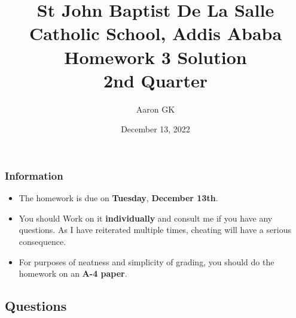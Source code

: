 \documentclass[9pt,addpoints]{exam}
\author{Aaron GK}
\date{December 13, 2022}
\begin{document}
	\title{St John Baptist De La Salle Catholic School, Addis Ababa\\
		\large Homework 3 Solution \\
		2nd Quarter}
	\maketitle
	\begin{center}
		\subsubsection*{Information}
		\begin{itemize}
			\item The homework is due on \textbf{Tuesday}, \textbf{December 13th}.
			\item You should Work on it \textbf{individually} and consult me if you have any questions. As I have reiterated multiple times, cheating will have a serious consequence.
			\item For purposes of neatness and simplicity of grading, you should do the homework on an \textbf{A-4 paper}.
		\end{itemize}
	\end{center}
	\begin{center}
		\subsection*{Questions}
	\end{center}
	
\end{document}
